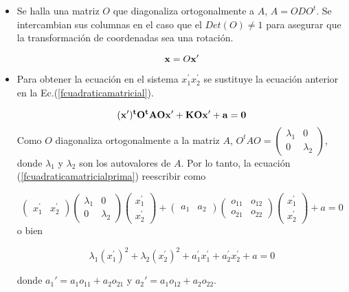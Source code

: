  \begin{itemize}
 
 \item
 Se halla una matriz $O$ que diagonaliza ortogonalmente a $A$, $A=ODO^t$. Se intercambian sus columnas en el caso que el $Det(O)\neq 1 $ para asegurar que la transformación de coordenadas sea una rotación.
 
 $$\bold x=O \bold x'$$
 
  \item
  Para obtener la ecuación en el sistema $x_1^\prime x_2^\prime$  se sustituye la ecuación anterior  en la Ec.(\ref{fcuadraticamatricial}).
 
 \begin{equation}
\bf (x^\prime) ^t O^t A O \bf x^\prime  + K O \bf x^\prime + a =0 \label{fcuadraticamatricialprima}
\end{equation}
Como $O$ diagonaliza ortogonalmente a la matriz $A$, $O^t A O =\left(\begin{array}{cc} \lambda_1 & 0 \\ 0 & \lambda_2
\end{array}
 \right)$,
 donde $\lambda_1$   y  $\lambda_2$  son los autovalores de $A$. Por lo tanto, la ecuación  (\ref{fcuadraticamatricialprima}) reescribir como
 
 \begin{equation}
\left(\begin{array}{cc}x_1^\prime & x_2^\prime
\end{array}
 \right) \left(\begin{array}{cc} \lambda_1& 0  \\ 0 & \lambda_2
\end{array}
 \right)  \left(\begin{array}{c} x_1^\prime \\x_2^\prime
\end{array}
 \right)+ \left(\begin{array}{cc}a_1 & a_2
\end{array}
 \right)
 \left(\begin{array}{cc} o_{11} & o_{12}  \\ o_{21} & o_{22}
\end{array}
 \right) 
 \left(\begin{array}{c} x_1^\prime \\x_2^\prime
\end{array}
 \right) +a=0\label{fcuadraticatoda}
\end{equation}
 o bien 
 
 $$\lambda_1(x^\prime_1)^{2}+\lambda_2(x^\prime_2)^{2}  +a_1^\prime x_1^\prime+ a_2^\prime x_2^\prime +a  =0$$

 \bigskip
 
 \noindent
 donde $a_1'=a_1o_{11}+a_2o_{21}$  y $a_2'=a_1o_{12}+a_2o_{22}$. 
 
  \end{itemize}
  

